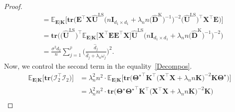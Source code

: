 \documentclass[12pt]{article}
\begin{document}
\begin{proof}
\begin{align}
    &= \mathbb{E}_{\mathbf{E}|\mathbf{K}}\bigg[\textbf{tr}\big( \mathbf{E}^{\top}\mathbf{X}\widehat{\mathbf{U}}^{\text{LS}}\big(n\mathbf{I}_{d_{1} \times d_{1}}+\lambda_{n}n\big(\widehat{\mathbf{D}}^{\text{K}}\big)^{-1}\big)^{-2} \big(\widehat{\mathbf{U}}^{\text{LS}}\big)^{\top}\mathbf{X}^{\top}\mathbf{E} \big)\bigg] \nonumber \\
    &= \textbf{tr}\big( \big(\widehat{\mathbf{U}}^{\text{LS}}\big)^{\top}\mathbb{E}_{\mathbf{E}|\mathbf{K}}\big[\mathbf{X}^{\top}\mathbf{E} \mathbf{E}^{\top}\mathbf{X}\big] \widehat{\mathbf{U}}^{\text{LS}}\big(n\mathbf{I}_{d_{1} \times d_{1}}+\lambda_{n}n\big(\widehat{\mathbf{D}}^{\text{K}}\big)^{-1}\big)^{-2} \big) \nonumber \\
    &= \frac{\sigma^{2}d_{2}}{n}\sum_{j=1}^{\widehat{r}}\bigg( \frac{\widehat{d}_{j}}{\widehat{d}_{j}+\lambda_{n}\omega_{j}} \bigg)^{2}.
\end{align}
Now, we control the second term in the equality~\eqref{Decompos}.
\begin{align}
    \mathbb{E}_{\mathbf{E}|\mathbf{K}}\bigg[\textbf{tr}\big(\mathcal{I}_{2}^{\top}\mathcal{I}_{2}\big)\bigg]
    &= \lambda_{n}^{2} n^{2} \cdot \mathbb{E}_{\mathbf{E}|\mathbf{K}}\bigg[\textbf{tr}
    \big(\boldsymbol{\Theta^\star}^{\top} \mathbf{K}^{\top} \big(\mathbf{X}^{\top}\mathbf{X}+\lambda_{n}n\mathbf{K}\big)^{-2}\mathbf{K}\boldsymbol{\Theta^\star} \big) \bigg] \nonumber \\
    &= \lambda_{n}^{2} n^{2} \cdot \textbf{tr}\big(\boldsymbol{\Theta^\star} \boldsymbol{\Theta^\star}^{\top} \mathbf{K}^{\top} \big(\mathbf{X}^{\top}\mathbf{X}+\lambda_{n}n\mathbf{K}\big)^{-2}\mathbf{K} \big) \nonumber \\

\end{align}
\end{proof}
\end{document}

